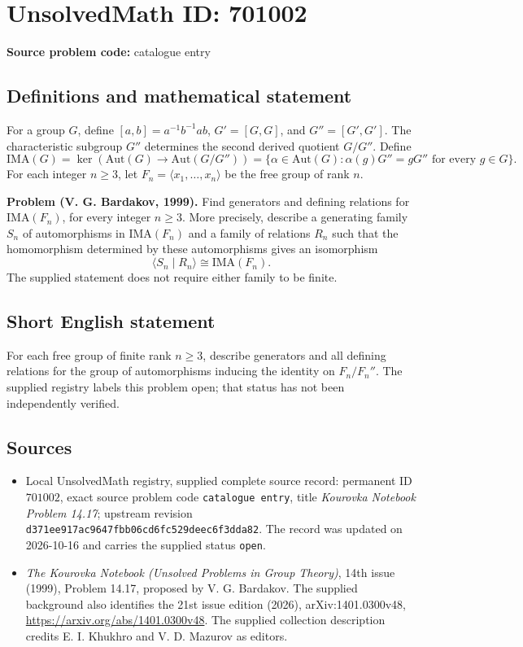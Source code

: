 \documentclass[11pt]{article}
\begin{document}
\section*{UnsolvedMath ID: 701002}
\textbf{Source problem code:} catalogue entry
\subsection{Definitions and mathematical statement}
For a group \(G\), define \([a,b]=a^{-1}b^{-1}ab\), \(G'=[G,G]\), and \(G''=[G',G']\). The characteristic subgroup \(G''\) determines the second derived quotient \(G/G''\). Define
\[
\mathrm{IMA}(G)=\ker\!\left(\mathrm{Aut}(G)\longrightarrow\mathrm{Aut}(G/G'')\right)
=\{\alpha\in\mathrm{Aut}(G):\alpha(g)G''=gG''\text{ for every }g\in G\}.
\]
For each integer \(n\geq 3\), let \(F_n=\langle x_1,\ldots,x_n\rangle\) be the free group of rank \(n\).

\textbf{Problem (V. G. Bardakov, 1999).} Find generators and defining relations for \(\mathrm{IMA}(F_n)\), for every integer \(n\geq 3\). More precisely, describe a generating family \(S_n\) of automorphisms in \(\mathrm{IMA}(F_n)\) and a family of relations \(R_n\) such that the homomorphism determined by these automorphisms gives an isomorphism
\[
\langle S_n\mid R_n\rangle\cong\mathrm{IMA}(F_n).
\]
The supplied statement does not require either family to be finite.
\subsection{Short English statement}
For each free group of finite rank \(n\geq 3\), describe generators and all defining relations for the group of automorphisms inducing the identity on \(F_n/F_n''\). The supplied registry labels this problem open; that status has not been independently verified.
\subsection{Sources}
\begin{itemize}
\item Local UnsolvedMath registry, supplied complete source record: permanent ID \(701002\), exact source problem code \texttt{catalogue entry}, title \emph{Kourovka Notebook Problem 14.17}; upstream revision \texttt{d371ee917ac9647fbb06cd6fc529deec6f3dda82}. The record was updated on 2026-10-16 and carries the supplied status \texttt{open}.
\item \emph{The Kourovka Notebook (Unsolved Problems in Group Theory)}, 14th issue (1999), Problem 14.17, proposed by V. G. Bardakov. The supplied background also identifies the 21st issue edition (2026), arXiv:1401.0300v48, \url{https://arxiv.org/abs/1401.0300v48}. The supplied collection description credits E. I. Khukhro and V. D. Mazurov as editors.
\end{itemize}
\end{document}
